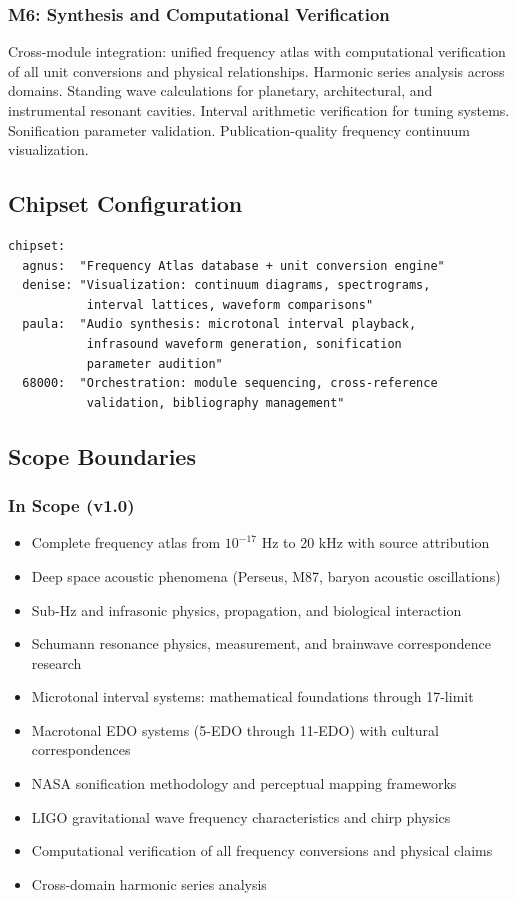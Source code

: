 \documentclass[11pt,letterpaper]{article}
\begin{document}
\subsubsection{M6: Synthesis and Computational Verification}
Cross-module integration: unified frequency atlas with computational verification of all unit conversions and physical relationships. Harmonic series analysis across domains. Standing wave calculations for planetary, architectural, and instrumental resonant cavities. Interval arithmetic verification for tuning systems. Sonification parameter validation. Publication-quality frequency continuum visualization.

\subsection{Chipset Configuration}

\begin{asciibox}
\begin{verbatim}
chipset:
  agnus:  "Frequency Atlas database + unit conversion engine"
  denise: "Visualization: continuum diagrams, spectrograms,
           interval lattices, waveform comparisons"
  paula:  "Audio synthesis: microtonal interval playback,
           infrasound waveform generation, sonification
           parameter audition"
  68000:  "Orchestration: module sequencing, cross-reference
           validation, bibliography management"
\end{verbatim}
\end{asciibox}

\subsection{Scope Boundaries}

\subsubsection{In Scope (v1.0)}
\begin{itemize}[leftmargin=2em]
\item Complete frequency atlas from $10^{-17}$ Hz to 20 kHz with source attribution
\item Deep space acoustic phenomena (Perseus, M87, baryon acoustic oscillations)
\item Sub-Hz and infrasonic physics, propagation, and biological interaction
\item Schumann resonance physics, measurement, and brainwave correspondence research
\item Microtonal interval systems: mathematical foundations through 17-limit
\item Macrotonal EDO systems (5-EDO through 11-EDO) with cultural correspondences
\item NASA sonification methodology and perceptual mapping frameworks
\item LIGO gravitational wave frequency characteristics and chirp physics
\item Computational verification of all frequency conversions and physical claims
\item Cross-domain harmonic series analysis
\end{itemize}
\end{document}
